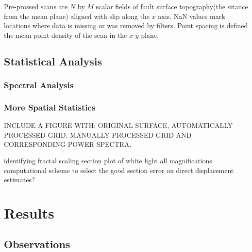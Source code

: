 \documentclass[12pt,a4paper]{article}
\begin{document}
Pre-prossed scans are $N$ by $M$ scalar fields of fault surface topography(the sitance from the mean plane) aligned with slip along the $x$ axis. NaN values mark locations where data is missing or was removed by filters. Point spacing is defined the mean point density of the scan in the $x$-$y$ plane.
	\subsection{Statistical Analysis}
		

		\subsubsection{Spectral Analysis}
		

		\subsubsection{More Spatial Statistics}
	

INCLUDE A FIGURE WITH: ORIGINAL SURFACE, AUTOMATICALLY PROCESSED GRID, MANUALLY PROCESSED GRID AND CORRESPONDING POWER SPECTRA.


identifying fractal scaling section
	plot of white light all magnifications
	computational scheme to select the good section
error on direct displacement estimates?

\section{Results}

	\subsection{Observations}
\end{document}
